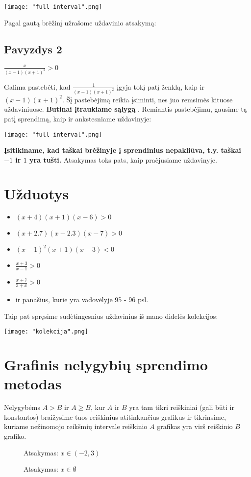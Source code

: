 \documentclass[12pt,a4paper]{report}
\numberwithin{table}{chapter}
\numberwithin{figure}{chapter}
\theoremstyle{definition}
\begin{document}
\texttt{[image: "full interval".png]}

Pagal gautą brėžinį užrašome uždavinio atsakymą: 
\subsection* {Pavyzdys 2}
$\frac{x}{(x-1)(x+1)^2}>0$

Galima pastebėti, kad $\frac{1}{(x-1)(x+1)^2}$ įgyja tokį patį ženklą, kaip ir $(x-1)(x+1)^2$. Šį pastebėjimą reikia įsiminti, nes juo remsimės kituose uždaviniuose. \textbf{Būtinai įtraukiame sąlygą} . Remiantis pastebėjimu, gausime tą patį sprendimą, kaip ir ankstesniame uždavinyje:

\texttt{[image: "full interval".png]}

\textbf{Įsitikiname, kad taškai brėžinyje į sprendinius nepakliūva, t.y. taškai $-1$ ir $1$ yra tušti.} Atsakymas toks pats, kaip praėjusiame uždavinyje.

\section {Užduotys}
\begin{itemize}
\item $(x+4)(x+1)(x-6)>0$
\item $(x+2.7)(x-2.3)(x-7)>0$
\item $(x-1)^2(x+1)(x-3)<0$
\item $\frac{x+3}{x-1}>0$
\item $\frac{x+7}{3+x}>0$
\item ir panašius, kurie yra vadovėlyje 95 - 96 psl.
\end{itemize} Taip pat spręsime sudėtingesnius uždavinius iš mano didelės kolekcijos:

\texttt{[image: "kolekcija".png]}

\section{Grafinis nelygybių sprendimo metodas}

Nelygybėms $A>B$ ir $A \geq B$, kur $A$ ir $B$ yra tam tikri reiškiniai (gali būti ir konstantos) braižysime tuos reiškinius atitinkančius grafikus ir tikrinsime, kuriame nežinomojo reikšmių intervale reiškinio $A$ grafikas yra virš reiškinio $B$ grafiko. 
\begin{figure}[!htb]
	\begin{minipage}{0.49\textwidth}
		\captionsetup{labelformat=empty}
		\caption{}
		Atsakymas: $x \in (-2,3)$
	\end{minipage}
	\begin{minipage}{0.49\textwidth}
		\captionsetup{labelformat=empty}
		\caption{}
		Atsakymas: $x \in \emptyset$
	\end{minipage}
\end{figure}
\end{document}
